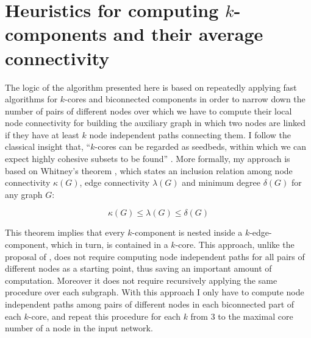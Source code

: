 \section{Heuristics for computing $k$-components and their average connectivity}

The logic of the algorithm presented here is based on repeatedly applying fast algorithms for $k$-cores \citep{batagelj:2011} and biconnected components \citep{tarjan:1972} in order to narrow down the number of pairs of different nodes over which we have to compute their local node connectivity for building the auxiliary graph in which two nodes are linked if they have at least $k$ node independent paths connecting them. I follow the classical insight that, ``$k$-cores can be regarded as seedbeds, within which we can expect highly cohesive subsets to be found'' \citet[281]{seidman:1983}. More formally, my approach is based on Whitney's theorem \citep[328]{white:2001}, which states an inclusion relation among node connectivity $\kappa(G)$, edge connectivity $\lambda(G)$ and minimum degree $\delta(G)$ for any graph $G$:

\begin{equation}
\kappa(G) \le \lambda(G) \le \delta(G)
\end{equation}

This theorem implies that every $k$-component is nested inside a $k$-edge-component, which in turn, is contained in a $k$-core. This approach, unlike the proposal of \citet{white:2001b}, does not require computing node independent paths for all pairs of different nodes as a starting point, thus saving an important amount of computation. Moreover it does not require recursively applying the same procedure over each subgraph. With this approach I only have to compute node independent paths among pairs of different nodes in each biconnected part of each $k$-core, and repeat this procedure for each $k$ from 3 to the maximal core number of a node in the input network.

